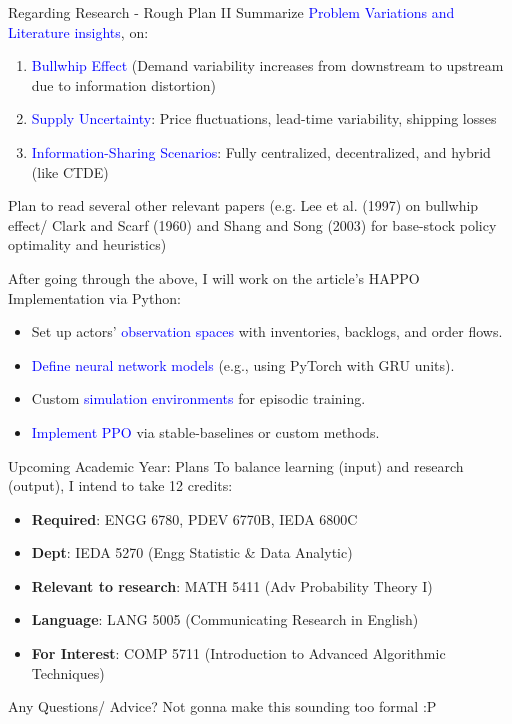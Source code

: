 \documentclass[xcolor=dvipsnames]{beamer}
\begin{document}
\begin{frame}{Regarding Research - Rough Plan II}
    \small
    Summarize \textcolor{blue}{Problem Variations and Literature insights}, on:
    \begin{enumerate}
    \item \textcolor{blue}{Bullwhip Effect} (Demand variability increases from downstream to upstream due to information distortion)
    \item \textcolor{blue}{Supply Uncertainty}: Price fluctuations, lead-time variability, shipping losses
    \item \textcolor{blue}{Information-Sharing Scenarios}: Fully centralized, decentralized, and hybrid (like CTDE)
    \end{enumerate}
    Plan to read several other relevant papers (e.g. Lee et al. (1997) on bullwhip effect/ 
    Clark and Scarf (1960) and Shang and Song (2003) for base-stock policy optimality and heuristics)   

    \vspace{1em}
    After going through the above, I will work on the article's HAPPO Implementation via Python:
    \begin{itemize}
    \item Set up actors' \textcolor{blue}{observation spaces} with inventories, backlogs, and order flows.
    \item \textcolor{blue}{Define neural network models} (e.g., using PyTorch with GRU units).
    \item Custom \textcolor{blue}{simulation environments} for episodic training.
    \item \textcolor{blue}{Implement PPO} via stable-baselines or custom methods.
    \end{itemize}
\end{frame}

\begin{frame}{Upcoming Academic Year: Plans}
    To balance learning (input) and research (output), I intend to take 12 credits:
    \begin{itemize}
    \item \textbf{Required}: ENGG 6780, PDEV 6770B, IEDA 6800C
    \item \textbf{Dept}: IEDA 5270 (Engg Statistic \& Data Analytic)
    \item \textbf{Relevant to research}: MATH 5411 (Adv Probability Theory I)
    \item \textbf{Language}: LANG 5005 (Communicating Research in English)
    \item \textbf{For Interest}: COMP 5711 (Introduction to Advanced Algorithmic Techniques)
    \end{itemize}
\end{frame}

\begin{frame}{Any Questions/ Advice?}
    Not gonna make this sounding too formal :P
\end{frame}
\end{document}
